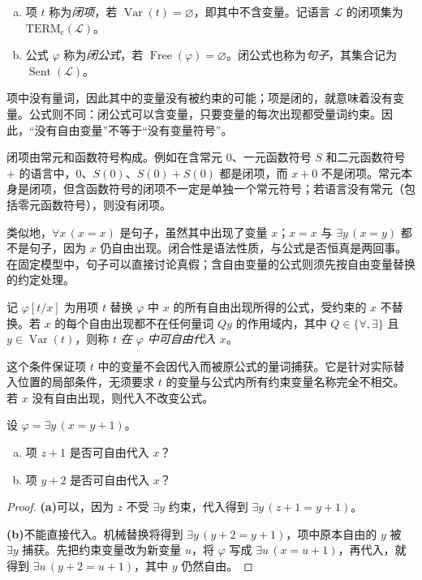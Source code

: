 \documentclass[lang=cn,a4paper,fontset=none,zihao=false,10pt,openany,twoside]{beautybook}
\numberwithin{algorithm}{chapter}
\begin{document}
\Needspace{48mm}
\begin{definition}[闭项、闭公式与句子]\label{def:closed}
\begin{enumerate}[(a)]
\item 项 $t$ 称为\emph{闭项}，若 $\operatorname{Var}(t)=\varnothing$，即其中不含变量。记语言 $\mathcal L$ 的闭项集为 $\mathrm{TERM}_{\mathrm c}(\mathcal L)$。
\item 公式 $\varphi$ 称为\emph{闭公式}，若 $\operatorname{Free}(\varphi)=\varnothing$。闭公式也称为\emph{句子}，其集合记为 $\operatorname{Sent}(\mathcal L)$。
\end{enumerate}
\end{definition}
项中没有量词，因此其中的变量没有被约束的可能；项是闭的，就意味着没有变量。公式则不同：闭公式可以含变量，只要变量的每次出现都受量词约束。因此，“没有自由变量”不等于“没有变量符号”。

闭项由常元和函数符号构成。例如在含常元 $0$、一元函数符号 $S$ 和二元函数符号 $+$ 的语言中，$0$、$S(0)$、$S(0)+S(0)$ 都是闭项，而 $x+0$ 不是闭项。常元本身是闭项，但含函数符号的闭项不一定是单独一个常元符号；若语言没有常元（包括零元函数符号），则没有闭项。

类似地，$\forall x\,(x=x)$ 是句子，虽然其中出现了变量 $x$；$x=x$ 与 $\exists y\,(x=y)$ 都不是句子，因为 $x$ 仍自由出现。闭合性是语法性质，与公式是否恒真是两回事。在固定模型中，句子可以直接讨论真假；含自由变量的公式则须先按自由变量替换的约定处理。

\begin{definition}[变量替换与可自由代入条件]
记 $\varphi[t/x]$ 为用项 $t$ 替换 $\varphi$ 中 $x$ 的所有自由出现所得的公式，受约束的 $x$ 不替换。若 $x$ 的每个自由出现都不在任何量词 $Qy$ 的作用域内，其中 $Q\in\{\forall,\exists\}$ 且 $y\in\operatorname{Var}(t)$，则称 $t$ \emph{在 $\varphi$ 中可自由代入 $x$}。
\end{definition}
这个条件保证项 $t$ 中的变量不会因代入而被原公式的量词捕获。它是针对实际替入位置的局部条件，无须要求 $t$ 的变量与公式内所有约束变量名称完全不相交。若 $x$ 没有自由出现，则代入不改变公式。

\begin{example}
设 $\varphi=\exists y\,(x=y+1)$。
\begin{enumerate}[(a)]
\item 项 $z+1$ 是否可自由代入 $x$？
\item 项 $y+2$ 是否可自由代入 $x$？
\end{enumerate}
\end{example}
\begin{proof}
\par\smallskip\noindent\textbf{(a)}\quad 可以，因为 $z$ 不受 $\exists y$ 约束，代入得到 $\exists y\,(z+1=y+1)$。

\par\smallskip\noindent\textbf{(b)}\quad 不能直接代入。机械替换将得到 $\exists y\,(y+2=y+1)$，项中原本自由的 $y$ 被 $\exists y$ 捕获。先把约束变量改为新变量 $u$，将 $\varphi$ 写成 $\exists u\,(x=u+1)$，再代入，就得到 $\exists u\,(y+2=u+1)$，其中 $y$ 仍然自由。
\end{proof}
\end{document}
